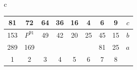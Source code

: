 \documentclass[12pt]{article}
\begin{document}
{{\begin{tabular}{c}
\begin{tabular}{|c|c|c|c|c|c|c|c||c}
\trianglepa{\,}81 & \trianglepa{\,}72 & \circlet{\,}64 & \circlet{\,}36 & \circlet{\,}16 & \circlet{\,}4 & \trianglepa{\,}6 & \trianglepa{\,}9 & $c$ \\ \hline
\squad{\,}153 & \rhombus{\,}$P^{91}$ & \trianglepa{\,}49 & \trianglepa{\,}42 & \trianglepa{\,}20 & \trianglepa{\,}25 & \squad{\,}45 & \squad{\,}15 & $b$ \\ \hline
\squad{\,}289 & \squad{\,}169 & \quad & \quad & \quad & \quad & \squad{\,}81 & \squad{\,}25 & $a$ \\ \hline
1 & 2 & 3 & 4 & 5 & 6 & 7 & 8 & \\
\end{tabular}
\end{tabular}
}}


\end{document}
